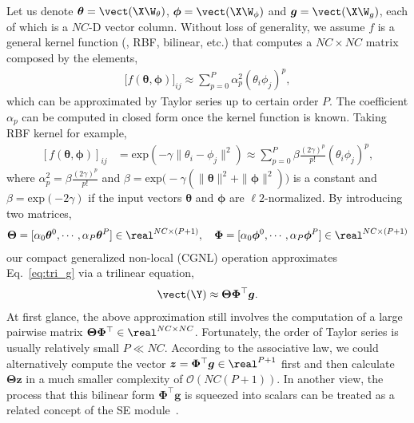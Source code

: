 \documentclass{article}
\begin{document}
Let us denote $\bm{\theta} = \vect(\X \W_\theta)$, $\bm{\phi} = \vect(\X \W_\phi)$ and $\bm{g} = \vect(\X \W_g)$, each of which is a $NC$-D vector column.
Without loss of generality, we assume $f$ is a general kernel function (\eg, RBF, bilinear, etc.) that computes a $NC \times NC$ matrix composed by the elements,
\begin{align}
  \label{eq:taylor_series}
  \big[ f(\bm{\theta}, \bm{\phi}) \big]_{ij} \approx \sum_{p=0}^{P} \alpha_p^2 (\theta_i \phi_j)^p,
\end{align}
which can be approximated by Taylor series up to certain order $P$.
The coefficient $\alpha_p$ can be computed in closed form once the kernel function is known.
Taking RBF kernel for example,
\begin{align}
  \label{eq:rbf}
  [f(\bm{\theta}, \bm{\phi})]_{ij} &= \text{exp}(-\gamma \| \theta_i - \phi_j \|^2)
                                     \approx \sum_{p=0}^{P} \beta \frac{(2\gamma)^p}{p!} (\theta_i \phi_j)^p,
\end{align}
where $\alpha_p^2 = \beta \frac{(2\gamma)^p}{p!}$ and $\beta = \text{exp} \big( -\gamma( \|\bm{\theta}\|^2 + \|\bm{\phi}\|^2 ) \big)$ is a constant and $\beta = \text{exp}(-2\gamma)$ if the input vectors $\bm{\theta}$ and $\bm{\phi}$ are $\ell2$-normalized.
By introducing two matrices,
\begin{align}
  \bm{\Theta} = [\alpha_0 \bm{\theta}^0, \cdots, \alpha_{P} \bm{\theta}^{P}] \in \real^{NC \times (P+1)}, \quad
  \bm{\Phi} = [\alpha_0 \bm{\phi}^0, \cdots, \alpha_{P} \bm{\phi}^{P}] \in \real^{NC \times (P+1)}
\end{align}
our compact generalized non-local (CGNL) operation approximates Eq.~\ref{eq:tri_g} via a trilinear equation,
\begin{align}
  \label{eq:final}
  \vect(\Y) \approx \bm{\Theta} \bm{\Phi}^\top \bm{g}.
\end{align}
At first glance, the above approximation still involves the computation of a large pairwise matrix $\bm{\Theta} \bm{\Phi}^\top \in \real^{NC \times NC}$.
Fortunately, the order of Taylor series is usually relatively small $P \ll NC$.
According to the associative law, we could alternatively compute the vector $\bm{z} = \bm{\Phi}^\top \bm{g} \in \real^{P+1}$ first and then calculate $\bm{\Theta} \bm{z}$ in a much smaller complexity of $\mathcal{O}(NC(P + 1))$. In another view, the process that this bilinear form $\bm{\Phi}^\top \bm{g}$ is squeezed into scalars can be treated as a related concept of the SE module~\cite{senet}.
%
%
\end{document}
